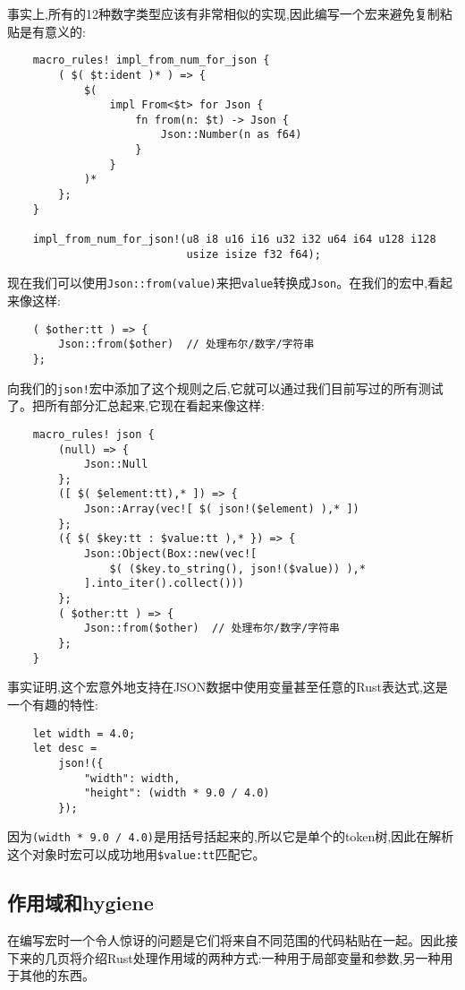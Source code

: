 事实上,所有的12种数字类型应该有非常相似的实现,因此编写一个宏来避免复制粘贴是有意义的:
\begin{verbatim}
    macro_rules! impl_from_num_for_json {
        ( $( $t:ident )* ) => {
            $(
                impl From<$t> for Json {
                    fn from(n: $t) -> Json {
                        Json::Number(n as f64)
                    }
                }
            )*
        };
    }

    impl_from_num_for_json!(u8 i8 u16 i16 u32 i32 u64 i64 u128 i128
                            usize isize f32 f64);
\end{verbatim}

现在我们可以使用\texttt{Json::from(value)}来把\texttt{value}转换成\texttt{Json}。在我们的宏中,看起来像这样:
\begin{verbatim}
    ( $other:tt ) => {
        Json::from($other)  // 处理布尔/数字/字符串
    };
\end{verbatim}

向我们的\texttt{json!}宏中添加了这个规则之后,它就可以通过我们目前写过的所有测试了。把所有部分汇总起来,它现在看起来像这样:
\begin{verbatim}
    macro_rules! json {
        (null) => {
            Json::Null
        };
        ([ $( $element:tt),* ]) => {
            Json::Array(vec![ $( json!($element) ),* ])
        };
        ({ $( $key:tt : $value:tt ),* }) => {
            Json::Object(Box::new(vec![
                $( ($key.to_string(), json!($value)) ),*
            ].into_iter().collect()))
        };
        ( $other:tt ) => {
            Json::from($other)  // 处理布尔/数字/字符串
        };
    }
\end{verbatim}

事实证明,这个宏意外地支持在JSON数据中使用变量甚至任意的Rust表达式,这是一个有趣的特性:
\begin{verbatim}
    let width = 4.0;
    let desc = 
        json!({
            "width": width,
            "height": (width * 9.0 / 4.0)
        });
\end{verbatim}

因为\texttt{(width * 9.0 / 4.0)}是用括号括起来的,所以它是单个的token树,因此在解析这个对象时宏可以成功地用\texttt{\$value:tt}匹配它。

\subsection{作用域和hygiene}
在编写宏时一个令人惊讶的问题是它们将来自不同范围的代码粘贴在一起。因此接下来的几页将介绍Rust处理作用域的两种方式:一种用于局部变量和参数,另一种用于其他的东西。

